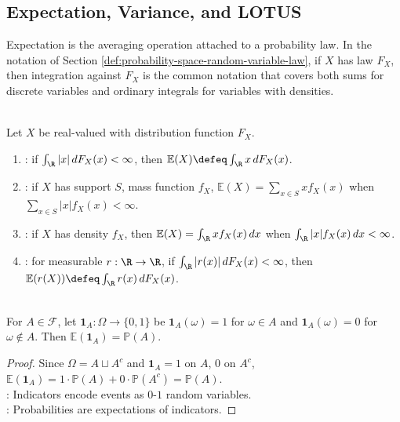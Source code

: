 \subsection{Expectation, Variance, and LOTUS}

Expectation is the averaging operation attached to a probability law. In the notation of Section \ref{def:probability-space-random-variable-law}, if $X$ has law $F_X$, then integration against $F_X$ is the common notation that covers both sums for discrete variables and ordinary integrals for variables with densities.

\begin{definition} \label{def:expectation-discrete-continuous-and-functionals} \\
Let $X$ be real-valued with distribution function $F_X$.
\begin{enumerate}[label=(\roman*)]
\setlength{\itemsep}{0pt}
\item {}: if $\int_{\R}|x|\,dF_X(x)<\infty$, then $\mathbb{E}(X)\defeq\int_{\R}x\,dF_X(x)$.
\item {}: if $X$ has support $S$, mass function $f_X$, $\mathbb{E}(X)=\sum\limits_{x\in S}xf_X(x)$ when $\sum\limits_{x\in S}|x|f_X(x)<\infty$.
\item {}: if $X$ has density $f_X$, then $\mathbb{E}(X)=\int_{\R}xf_X(x)\,dx$ when $\int_{\R}|x|f_X(x)\,dx<\infty$.
\item {}: for measurable $r:\R\to\R$, if $\int_{\R}|r(x)|\,dF_X(x)<\infty$, then $\mathbb{E}(r(X))\defeq\int_{\R}r(x)\,dF_X(x)$.
\end{enumerate}
\end{definition}

\begin{proposition} \label{prop:indicator-expectation-probability} \\
For $A\in\mathcal{F}$, let $\mathbf{1}_A:\Omega\to\{0,1\}$ be $\mathbf{1}_A(\omega)=1$ for $\omega\in A$ and $\mathbf{1}_A(\omega)=0$ for $\omega\notin A$. Then $\mathbb{E}(\mathbf{1}_A)=\mathbb{P}(A)$.
\begin{proof}
Since $\Omega=A\sqcup A^c$ and $\mathbf{1}_A=1$ on $A$, $0$ on $A^c$, $\mathbb{E}(\mathbf{1}_A)=1\cdot\mathbb{P}(A)+0\cdot\mathbb{P}(A^c)=\mathbb{P}(A)$.\\
: Indicators encode events as $0$-$1$ random variables.\\
: Probabilities are expectations of indicators.
\end{proof}
\end{proposition}

